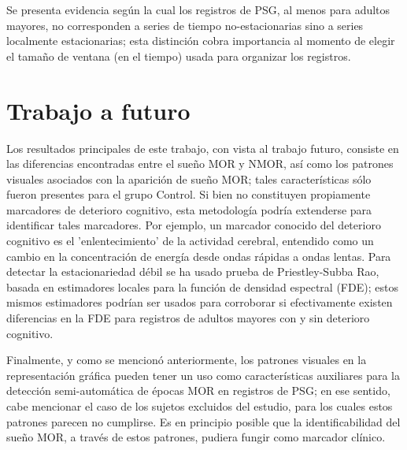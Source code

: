 Se presenta evidencia seg\'un la cual los registros de PSG, al menos para adultos mayores, no 
corresponden a series de tiempo no-estacionarias sino a series localmente estacionarias; esta 
distinci\'on cobra importancia al momento de elegir el tama\~no de ventana (en el tiempo) usada 
para organizar los registros.


\section{Trabajo a futuro}

Los resultados principales de este trabajo, con vista al trabajo futuro, consiste en las 
diferencias encontradas entre el sue\~no MOR y NMOR, as\'i como los patrones visuales asociados con 
la aparici\'on de sue\~no MOR; tales caracter\'isticas s\'olo fueron presentes para el grupo 
Control. Si bien no constituyen propiamente marcadores de deterioro cognitivo, esta metodolog\'ia
podr\'ia extenderse para identificar tales marcadores.
Por ejemplo, un marcador conocido \cite{Becerra12} del deterioro cognitivo es el 'enlentecimiento' 
de la actividad cerebral, entendido como un cambio en la concentraci\'on de energ\'ia desde ondas 
r\'apidas a ondas lentas.
Para detectar la estacionariedad d\'ebil se ha usado prueba de Priestley-Subba Rao, basada en 
estimadores locales para la funci\'on de densidad espectral (FDE); estos mismos estimadores 
podr\'ian ser usados para corroborar si efectivamente existen diferencias en la FDE para registros 
de adultos mayores con y sin deterioro cognitivo. 

Finalmente, y como se mencion\'o anteriormente, los patrones visuales en la representaci\'on 
gr\'afica pueden tener un uso como caracter\'isticas auxiliares para la detecci\'on 
semi-autom\'atica de \'epocas MOR en registros de PSG; en ese sentido, cabe mencionar el caso de 
los sujetos excluidos del estudio, para los cuales estos patrones parecen no cumplirse. 
Es en principio posible que la identificabilidad del sue\~no MOR, a trav\'es de estos patrones, 
pudiera fungir como marcador cl\'inico.

